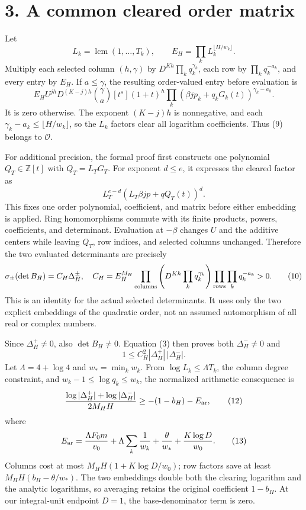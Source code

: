 \documentclass[11pt]{article}
\begin{document}
\section{3. A common cleared order
matrix}\label{a-common-cleared-order-matrix}

Let \[
L_k=\operatorname{lcm}(1,\ldots,T_k),\qquad
E_H=\prod_kL_k^{\lfloor H/w_k\rfloor}.
\] Multiply each selected column \((h,\gamma)\) by
\(D^{Kh}\prod_kq_k^{\gamma_k}\), each row by \(\prod_kq_k^{-a_k}\), and
every entry by \(E_H\). If \(a\le\gamma\), the resulting order-valued
entry before evaluation is \[
E_H U^{jh}D^{(K-j)h}\binom\gamma a
[t^s](1+t)^h
\prod_k(\beta jp_k+q_kG_k(t))^{\gamma_k-a_k}.
\tag{9}
\] It is zero otherwise. The exponent \((K-j)h\) is nonnegative, and
each \(\gamma_k-a_k\le\lfloor H/w_k\rfloor\), so the \(L_k\) factors
clear all logarithm coefficients. Thus (9) belongs to \(\mathcal O\).

For additional precision, the formal proof first constructs one
polynomial \(Q_T\in\mathbb Z[t]\) with \(Q_T=L_TG_T\). For exponent
\(d\le e\), it expresses the cleared factor as \[
L_T^{e-d}(L_T\beta jp+qQ_T(t))^d.
\] This fixes one order polynomial, coefficient, and matrix before
either embedding is applied. Ring homomorphisms commute with its finite
products, powers, coefficients, and determinant. Evaluation at
\(-\beta\) changes \(U\) and the additive centers while leaving \(Q_T\),
row indices, and selected columns unchanged. Therefore the two evaluated
determinants are precisely \[
\sigma_\pm(\det B_H)=C_H\Delta_H^\pm,
\quad
C_H=E_H^{M_H}
\prod_{\rm columns}\left(D^{Kh}\prod_kq_k^{\gamma_k}\right)
\prod_{\rm rows}\prod_kq_k^{-a_k}>0.
\tag{10}
\] This is an identity for the actual selected determinants. It uses
only the two explicit embeddings of the quadratic order, not an assumed
automorphism of all real or complex numbers.

Since \(\Delta_H^+\ne0\), also \(\det B_H\ne0\). Equation (3) then
proves both \(\Delta_H^-\ne0\) and \[
1\le C_H^2|\Delta_H^+|\,|\Delta_H^-|.
\tag{11}
\] Let \(\Lambda=4+\log4\) and \(w_* =\min_kw_k\). From
\(\log L_k\le\Lambda T_k\), the column degree constraint, and
\(w_k-1\le\log q_k\le w_k\), the normalized arithmetic consequence is \[
\frac{\log|\Delta_H^+|+\log|\Delta_H^-|}{2M_HH}
\ge -(1-b_H)-E_{\rm ar},
\tag{12}
\] where \[
E_{\rm ar}=\frac{\Lambda F_0m}{v_0}
+\Lambda\sum_k\frac1{w_k}+\frac\theta{w_*}
+\frac{K\log D}{w_0}.
\tag{13}
\] Columns cost at most \(M_HH(1+K\log D/w_0)\); row factors save at
least \(M_HH(b_H-\theta/w_*)\). The two embeddings double both the
clearing logarithm and the analytic logarithms, so averaging retains the
original coefficient \(1-b_H\). At our integral-unit endpoint \(D=1\),
the base-denominator term is zero.
\end{document}
